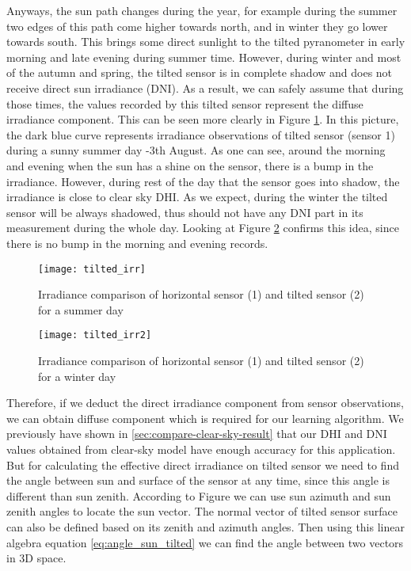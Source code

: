 Anyways, the sun path changes during the year, for example during the summer two edges of this path come higher towards north, and in winter they go lower towards south. This brings some direct sunlight to the tilted pyranometer in early morning and late evening during summer time. However, during winter and most of the autumn and spring, the tilted sensor is in complete shadow and does not receive direct sun irradiance (DNI). As a result, we can safely assume that during those times, the values recorded by this tilted sensor represent the diffuse irradiance component. This can be seen more clearly in Figure \ref{fig:tilted_irr_cmp}. In this picture, the dark blue curve represents irradiance observations of tilted sensor (sensor 1) during a sunny summer day -3th August. As one can see, around the morning and evening when the sun has a shine on the sensor, there is a bump in the irradiance. However, during rest of the day that the sensor goes into shadow, the irradiance is close to clear sky DHI. As we expect, during the winter the tilted sensor will be always shadowed, thus should not have any DNI part in its measurement during the whole day. Looking at Figure \ref{fig:tilted_irr_cmp2} confirms this idea, since there is no bump in the morning and evening records.

\begin{figure}[h]
\caption{Irradiance comparison of horizontal sensor (1) and tilted sensor (2) for a summer day}
\label{fig:tilted_irr_cmp}
\texttt{[image: tilted\_irr]}
\centering
\end{figure}

\begin{figure}[h]
\caption{Irradiance comparison of horizontal sensor (1) and tilted sensor (2) for a winter day}
\label{fig:tilted_irr_cmp2}
\texttt{[image: tilted\_irr2]}
\centering
\end{figure}

Therefore, if we deduct the direct irradiance component from sensor observations, we can obtain diffuse component which is required for our learning algorithm. We previously have shown in \ref{sec:compare-clear-sky-result} that our DHI and DNI values obtained from clear-sky model have enough accuracy for this application. But for calculating the effective direct irradiance on tilted sensor we need to find the angle between sun and surface of the sensor at any time, since this angle is different than sun zenith. According to Figure we can use sun azimuth and sun zenith angles to locate the sun vector. The normal vector of tilted sensor surface can also be defined based on its zenith and azimuth angles. Then using this linear algebra equation \ref{eq:angle_sun_tilted} we can find the angle between two vectors in 3D space.

